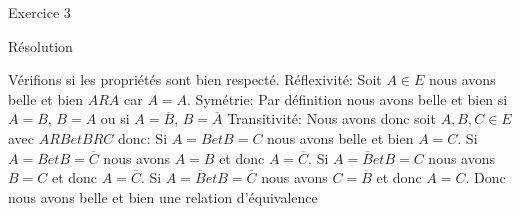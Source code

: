 \hypertarget{Exercice_3}{
\Huge{\begin{center}Exercice 3\end{center} \leavevmode\newline }}

\hypertarget{resolution}{%
\LARGE{Résolution}\label{resolution}}
\newline
\newline
Vérifions si les propriétés sont bien respecté.
\newline
\newline
Réflexivité: Soit $A \in E$ nous avons belle et bien $ARA$ car $A = A$.
\newline
Symétrie: Par définition nous avons belle et bien si $A=B$, $B=A$ ou si $A=\overline{B}$, $B=\overline{A}$
\newline
Transitivité:  Nous avons donc soit $A, B, C \in E$ avec $ARB et BRC$ donc:
\newline
Si $A=B et B=C$ nous avons belle et bien $A=C$.
Si $A=B et B=\overline{C}$ nous avons $A=B$ et donc $A=\overline{C}$.
Si $A=\overline{B} et B=C$ nous avons $B=C$ et donc $A=\overline{C}$.
Si $A=\overline{B} et B=\overline{C}$ nous avons $C=\overline{B}$ et donc $A=C$.
\newline
\newline
Donc nous avons belle et bien une relation d'équivalence
